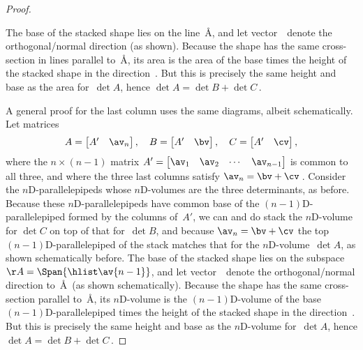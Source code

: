 \begin{proof}
\begin{center}
\end{center}
The base of the stacked shape lies on the line~\AA, and let vector~\nv\ denote the orthogonal\slash normal direction (as shown).
Because the shape has the same cross-section in lines parallel to~\AA, its area is the area of the base times the height of the stacked shape in the direction~\nv.
But this is precisely the same height and base as the area for~\(\det A\), hence \(\det A=\det B+\det C\)\,.

A general proof for the last column uses the same diagrams, albeit schematically. 
Let matrices
\begin{equation*}
A=\begin{bmatrix} A'& \av_n \end{bmatrix},\quad
B=\begin{bmatrix} A'& \bv \end{bmatrix},\quad
C=\begin{bmatrix} A'& \cv \end{bmatrix},
\end{equation*}
where the \(n\times(n-1)\) matrix \(A'=\begin{bmatrix} \av_1&\av_2&\cdots&\av_{n-1} \end{bmatrix}\) is common to all three,
and where the three last columns satisfy \(\av_n=\bv+\cv\)\,.
Consider the \(n\)D-parallelepipeds whose \(n\)D-volumes are the three determinants, as before.
Because these \(n\)D-parallelepipeds have common base of the \((n-1)\)D-parallelepiped formed by the columns of~\(A'\), we can and do stack the \(n\)D-volume for \(\det C\) on top of that for~\(\det B\), and because \(\av_n=\bv+\cv\) the top \((n-1)\)D-parallelepiped of the stack matches that for the \(n\)D-volume~\(\det A\), as shown schematically before.
The base of the stacked shape lies on the subspace \(\AA=\Span\{\hlist\av{n-1}\}\), and let vector~\nv\ denote the orthogonal\slash normal direction to~\AA\ (as shown schematically).
Because the shape has the same cross-section parallel to~\AA, its \(n\)D-volume is the \((n-1)\)D-volume of the base \((n-1)\)D-parallelepiped times the height of the stacked shape in the direction~\nv.
But this is precisely the same height and base as the \(n\)D-volume for~\(\det A\), hence \(\det A=\det B+\det C\)\,.


\end{proof}
